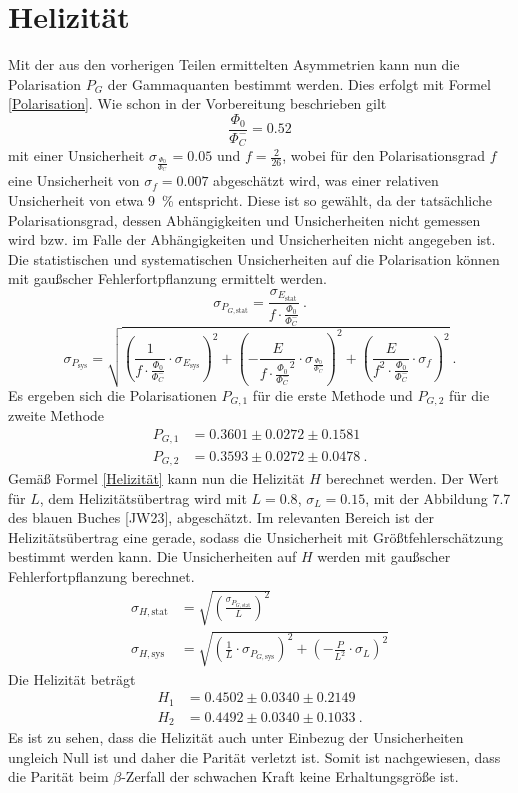 \section{Helizität}
Mit der aus den vorherigen Teilen ermittelten Asymmetrien kann nun die Polarisation $P_{G}$ der Gammaquanten bestimmt werden. Dies erfolgt mit Formel \ref{Polarisation}. Wie schon in der Vorbereitung beschrieben gilt $$\frac{\Phi_0}{\Phi_C^-}= 0.52$$ mit einer Unsicherheit $\sigma_{\frac{\Phi_0}{\Phi_C^-}}=0.05$ und $f=\frac{2}{26}$, wobei für den Polarisationsgrad $f$ eine Unsicherheit von $\sigma_{f}=0.007$ abgeschätzt wird, was einer relativen Unsicherheit von etwa \SI{9}{\%} entspricht. Diese ist so gewählt, da der tatsächliche Polarisationsgrad, dessen Abhängigkeiten und Unsicherheiten nicht gemessen wird bzw. im Falle der Abhängigkeiten und Unsicherheiten nicht angegeben ist. \\
Die statistischen und systematischen Unsicherheiten auf die Polarisation können mit gaußscher Fehlerfortpflanzung ermittelt werden.
 $$\sigma_{P_{G,\text{stat}}}=\frac{\sigma_{E_\text{stat}}}{f \cdot \frac{\Phi_0}{\Phi_C^-}}~.$$ 
$$\sigma_{P_\text{sys}}=\sqrt{\left(\frac{1}{f \cdot \frac{\Phi_0}{\Phi_C^-}}\cdot \sigma_{E_\text{sys}} \right)^{2} + \left( -\frac{E}{f \cdot \frac{\Phi_0}{\Phi_C^-}^{2}}\cdot \sigma_{\frac{\Phi_0}{\Phi_C^-}}\right)^{2} + \left(\frac{E}{f^{2} \cdot \frac{\Phi_0}{\Phi_C^-}} \cdot \sigma_{f}\right)^{2}} ~.$$
Es ergeben sich die Polarisationen $P_{G,1}$ für die erste Methode und $P_{G,2}$ für die zweite Methode \begin{align*}
    P_{G,1}&=0.3601 \pm 0.0272 \pm 0.1581 \\
    P_{G,2}&=0.3593 \pm 0.0272 \pm 0.0478 ~.
\end{align*} 
Gemäß Formel \ref{Helizität} kann nun die Helizität $H$ berechnet werden. Der Wert für $L$, dem Helizitätsübertrag wird mit $L=0.8$, $\sigma_{L}=0.15$, mit der Abbildung 7.7 des blauen Buches [JW23], abgeschätzt. Im relevanten Bereich ist der Helizitätsübertrag eine gerade, sodass die Unsicherheit mit Größtfehlerschätzung bestimmt werden kann. Die Unsicherheiten auf $H$ werden mit gaußscher Fehlerfortpflanzung berechnet. 
\begin{align*} 
    \sigma_{H,\text{stat}}&=\sqrt{\left(\frac{\sigma_{P_{G,\text{stat}}}}{L}\right)^{2}} \\
    \sigma_{H,\text{sys}}&=\sqrt{\left(\frac{1}{L}\cdot \sigma_{P_{G,\text{sys}}}\right)^{2} + \left(-\frac{P}{L^{2}}\cdot \sigma_{L}\right)^{2}}
\end{align*} 
Die Helizität beträgt 
\begin{align*} 
    H_{1}&=0.4502 \pm 0.0340 \pm 0.2149\\
    H_{2}&=0.4492 \pm 0.0340 \pm 0.1033 ~.
\end{align*}
Es ist zu sehen, dass die Helizität auch unter Einbezug der Unsicherheiten ungleich Null ist und daher die Parität verletzt ist. Somit ist nachgewiesen, dass die Parität beim $\beta$-Zerfall der schwachen Kraft keine Erhaltungsgröße ist.